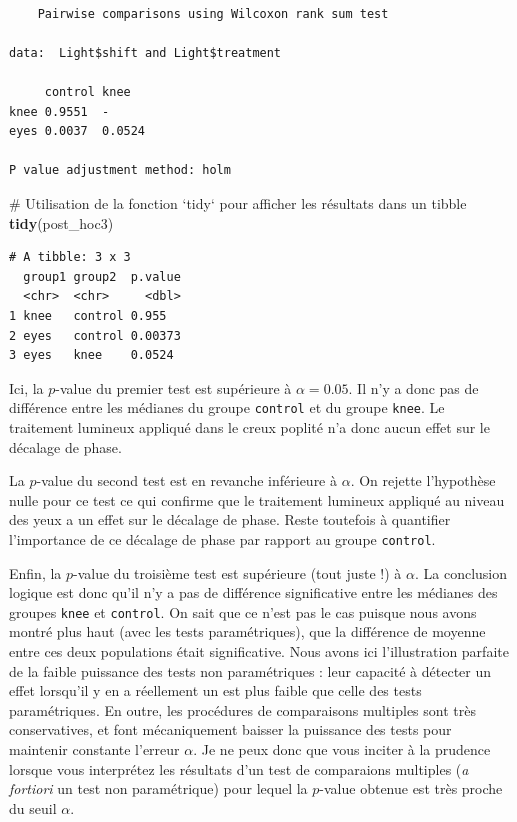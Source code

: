 \documentclass[a4paperpaper,]{article}
\newenvironment{Shaded}{\begin{snugshade}}{\end{snugshade}}
\newcommand{\CommentTok}[1]{\textcolor[rgb]{0.54,0.53,0.53}{#1}}
\newcommand{\KeywordTok}[1]{\textcolor[rgb]{0.12,0.11,0.11}{\textbf{#1}}}
\newcommand{\NormalTok}[1]{\textcolor[rgb]{0.12,0.11,0.11}{#1}}
\begin{document}
\begin{verbatim}

    Pairwise comparisons using Wilcoxon rank sum test 

data:  Light$shift and Light$treatment 

     control knee  
knee 0.9551  -     
eyes 0.0037  0.0524

P value adjustment method: holm 
\end{verbatim}

\begin{Shaded}
\begin{Highlighting}[]
\CommentTok{# Utilisation de la fonction `tidy` pour afficher les résultats dans un tibble}
\KeywordTok{tidy}\NormalTok{(post_hoc3)}
\end{Highlighting}
\end{Shaded}

\begin{verbatim}
# A tibble: 3 x 3
  group1 group2  p.value
  <chr>  <chr>     <dbl>
1 knee   control 0.955  
2 eyes   control 0.00373
3 eyes   knee    0.0524 
\end{verbatim}

Ici, la \(p\)-value du premier test est supérieure à \(\alpha = 0.05\). Il n'y a donc pas de différence entre les médianes du groupe \texttt{control} et du groupe \texttt{knee}. Le traitement lumineux appliqué dans le creux poplité n'a donc aucun effet sur le décalage de phase.

La \(p\)-value du second test est en revanche inférieure à \(\alpha\). On rejette l'hypothèse nulle pour ce test ce qui confirme que le traitement lumineux appliqué au niveau des yeux a un effet sur le décalage de phase. Reste toutefois à quantifier l'importance de ce décalage de phase par rapport au groupe \texttt{control}.

Enfin, la \(p\)-value du troisième test est supérieure (tout juste !) à \(\alpha\). La conclusion logique est donc qu'il n'y a pas de différence significative entre les médianes des groupes \texttt{knee} et \texttt{control}. On sait que ce n'est pas le cas puisque nous avons montré plus haut (avec les tests paramétriques), que la différence de moyenne entre ces deux populations était significative. Nous avons ici l'illustration parfaite de la faible puissance des tests non paramétriques : leur capacité à détecter un effet lorsqu'il y en a réellement un est plus faible que celle des tests paramétriques. En outre, les procédures de comparaisons multiples sont très conservatives, et font mécaniquement baisser la puissance des tests pour maintenir constante l'erreur \(\alpha\). Je ne peux donc que vous inciter à la prudence lorsque vous interprétez les résultats d'un test de comparaions multiples (\emph{a fortiori} un test non paramétrique) pour lequel la \(p\)-value obtenue est très proche du seuil \(\alpha\).
\end{document}

